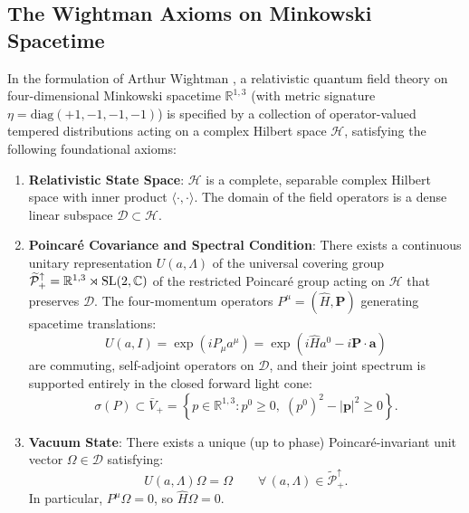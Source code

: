 \subsection{The Wightman Axioms on Minkowski Spacetime}
\label{subsec:wightman_axioms}
In the formulation of Arthur Wightman \cite{StreaterWightman1964, JaffeWitten2000}, a relativistic quantum field theory on four-dimensional Minkowski spacetime $\mathbb{R}^{1,3}$ (with metric signature $\eta = \mathrm{diag}(+1, -1, -1, -1)$) is specified by a collection of operator-valued tempered distributions acting on a complex Hilbert space $\mathcal{H}$, satisfying the following foundational axioms:
\begin{enumerate}
    \item[$\mathbf{W0}$] \textbf{Relativistic State Space}: $\mathcal{H}$ is a complete, separable complex Hilbert space with inner product $\langle \cdot, \cdot \rangle$. The domain of the field operators is a dense linear subspace $\mathcal{D} \subset \mathcal{H}$.
    \item[$\mathbf{W1}$] \textbf{Poincar\'e Covariance and Spectral Condition}: There exists a continuous unitary representation $U(a, \Lambda)$ of the universal covering group $\widetilde{\mathcal{P}}_+^\uparrow = \mathbb{R}^{1,3} \rtimes \mathrm{SL}(2, \mathbb{C})$ of the restricted Poincaré group acting on $\mathcal{H}$ that preserves $\mathcal{D}$. The four-momentum operators $P^\mu = (\hat{H}, \mathbf{P})$ generating spacetime translations:
    \begin{equation}
    U(a, I) = \exp\left( i P_\mu a^\mu \right) = \exp\left( i \hat{H} a^0 - i \mathbf{P} \cdot \mathbf{a} \right)
    \end{equation}
    are commuting, self-adjoint operators on $\mathcal{D}$, and their joint spectrum is supported entirely in the closed forward light cone:
    \begin{equation}
    \sigma(P) \subset \bar{V}_+ = \left\{ p \in \mathbb{R}^{1,3} : p^0 \ge 0, \; (p^0)^2 - |\mathbf{p}|^2 \ge 0 \right\}.
    \end{equation}
    \item[$\mathbf{W2}$] \textbf{Vacuum State}: There exists a unique (up to phase) Poincaré-invariant unit vector $\Omega \in \mathcal{D}$ satisfying:
    \begin{equation}
    U(a, \Lambda) \Omega = \Omega \qquad \forall \, (a, \Lambda) \in \widetilde{\mathcal{P}}_+^\uparrow.
    \end{equation}
    In particular, $P^\mu \Omega = 0$, so $\hat{H} \Omega = 0$.

\end{enumerate}
